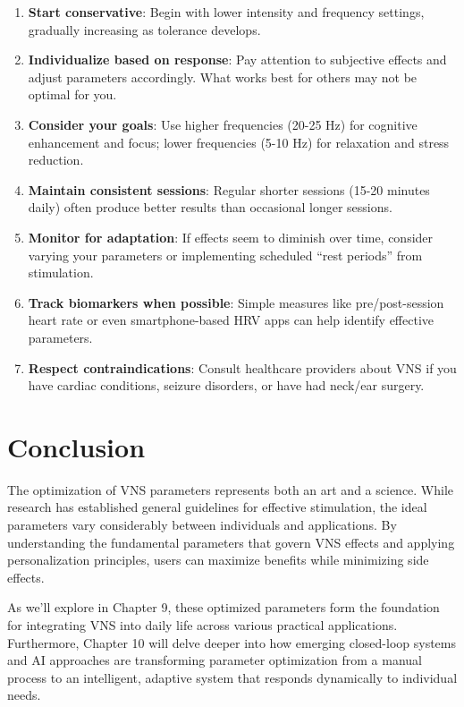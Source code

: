 \documentclass[
  Letterpaper,
]{scrbook}
\begin{document}
\begin{enumerate}
\def\labelenumi{\arabic{enumi}.}
\item
  \textbf{Start conservative}: Begin with lower intensity and frequency
  settings, gradually increasing as tolerance develops.
\item
  \textbf{Individualize based on response}: Pay attention to subjective
  effects and adjust parameters accordingly. What works best for others
  may not be optimal for you.
\item
  \textbf{Consider your goals}: Use higher frequencies (20-25 Hz) for
  cognitive enhancement and focus; lower frequencies (5-10 Hz) for
  relaxation and stress reduction.
\item
  \textbf{Maintain consistent sessions}: Regular shorter sessions (15-20
  minutes daily) often produce better results than occasional longer
  sessions.
\item
  \textbf{Monitor for adaptation}: If effects seem to diminish over
  time, consider varying your parameters or implementing scheduled
  ``rest periods'' from stimulation.
\item
  \textbf{Track biomarkers when possible}: Simple measures like
  pre/post-session heart rate or even smartphone-based HRV apps can help
  identify effective parameters.
\item
  \textbf{Respect contraindications}: Consult healthcare providers about
  VNS if you have cardiac conditions, seizure disorders, or have had
  neck/ear surgery.
\end{enumerate}

\section{Conclusion}\label{conclusion}

The optimization of VNS parameters represents both an art and a science.
While research has established general guidelines for effective
stimulation, the ideal parameters vary considerably between individuals
and applications. By understanding the fundamental parameters that
govern VNS effects and applying personalization principles, users can
maximize benefits while minimizing side effects.

As we'll explore in Chapter 9, these optimized parameters form the
foundation for integrating VNS into daily life across various practical
applications. Furthermore, Chapter 10 will delve deeper into how
emerging closed-loop systems and AI approaches are transforming
parameter optimization from a manual process to an intelligent, adaptive
system that responds dynamically to individual needs.
\end{document}
